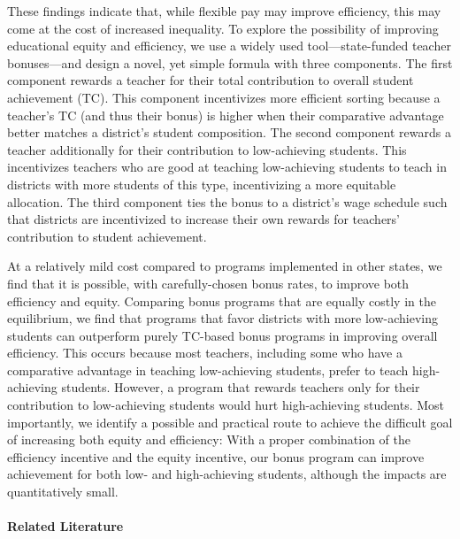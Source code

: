 \documentclass[notitlepage,12pt]{article}%
\begin{document}
These findings indicate that, while flexible pay may improve efficiency, this
may come at the cost of increased inequality. To explore the possibility of
improving educational equity and efficiency, we use a widely used
tool---state-funded teacher bonuses---and design a novel, yet simple formula
with three components. The first component rewards a teacher for their total
contribution to overall student achievement (TC). This component incentivizes
more efficient sorting because a teacher's TC (and thus their bonus) is higher
when their comparative advantage better matches a district's student
composition. The second component rewards a teacher additionally for their
contribution to low-achieving students. This incentivizes teachers who are
good at teaching low-achieving students to teach in districts with more
students of this type, incentivizing a more equitable allocation. The third
component ties the bonus to a district's wage schedule such that districts are
incentivized to increase their own rewards for teachers' contribution to
student achievement.

At a relatively mild cost compared to programs implemented in other states, we
find that it is possible, with carefully-chosen bonus rates, to improve both
efficiency and equity. Comparing bonus programs that are equally costly in the
equilibrium, we find that programs that favor districts with more
low-achieving students can outperform purely TC-based bonus programs in
improving overall efficiency. This occurs because most teachers, including
some who have a comparative advantage in teaching low-achieving students,
prefer to teach high-achieving students. However, a program that rewards
teachers only for their contribution to low-achieving students would hurt
high-achieving students. Most importantly, we identify a possible and
practical route to achieve the difficult goal of increasing both equity and
efficiency: With a proper combination of the efficiency incentive and the
equity incentive, our bonus program can improve achievement for both low- and
high-achieving students, although the impacts are quantitatively small.

\paragraph{Related Literature}
\end{document}
